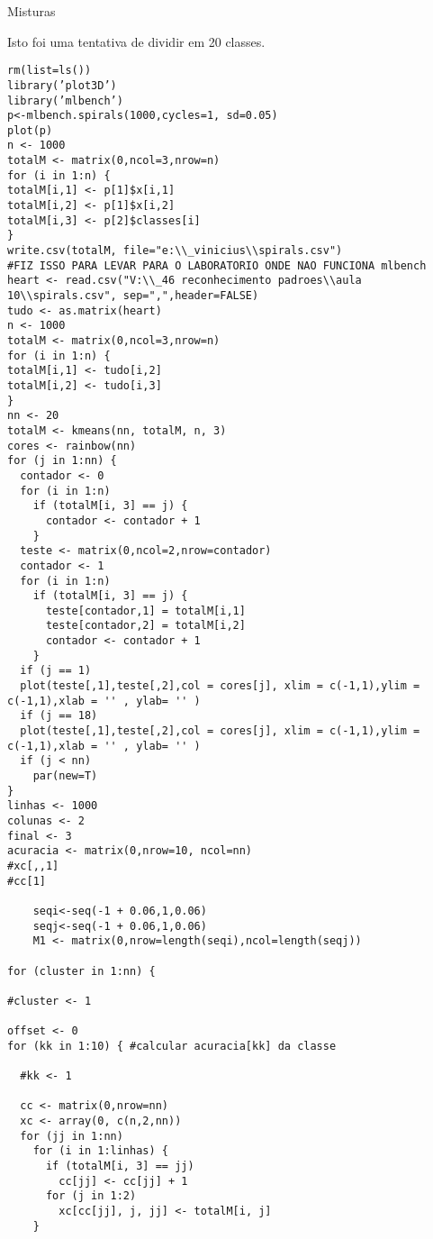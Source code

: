 \documentclass[12pt]{article}
\begin{document}
\Large

\begin{center}
Misturas
\end{center}

\normalsize

Isto foi uma tentativa de dividir em 20 classes.

\begin{verbatim}
rm(list=ls())
library(’plot3D’)
library(’mlbench’)
p<-mlbench.spirals(1000,cycles=1, sd=0.05)
plot(p)
n <- 1000
totalM <- matrix(0,ncol=3,nrow=n)
for (i in 1:n) {
totalM[i,1] <- p[1]$x[i,1]
totalM[i,2] <- p[1]$x[i,2]
totalM[i,3] <- p[2]$classes[i]
}
write.csv(totalM, file="e:\\_vinicius\\spirals.csv")
#FIZ ISSO PARA LEVAR PARA O LABORATORIO ONDE NAO FUNCIONA mlbench
heart <- read.csv("V:\\_46 reconhecimento padroes\\aula 10\\spirals.csv", sep=",",header=FALSE)
tudo <- as.matrix(heart)
n <- 1000
totalM <- matrix(0,ncol=3,nrow=n)
for (i in 1:n) {
totalM[i,1] <- tudo[i,2]
totalM[i,2] <- tudo[i,3]
}
nn <- 20
totalM <- kmeans(nn, totalM, n, 3)
cores <- rainbow(nn)
for (j in 1:nn) {
  contador <- 0
  for (i in 1:n)
    if (totalM[i, 3] == j) {
      contador <- contador + 1
    }
  teste <- matrix(0,ncol=2,nrow=contador)
  contador <- 1
  for (i in 1:n)
    if (totalM[i, 3] == j) {
      teste[contador,1] = totalM[i,1]
      teste[contador,2] = totalM[i,2]
      contador <- contador + 1
    }
  if (j == 1)
  plot(teste[,1],teste[,2],col = cores[j], xlim = c(-1,1),ylim = c(-1,1),xlab = '' , ylab= '' )
  if (j == 18)
  plot(teste[,1],teste[,2],col = cores[j], xlim = c(-1,1),ylim = c(-1,1),xlab = '' , ylab= '' )
  if (j < nn)
    par(new=T)
}
linhas <- 1000
colunas <- 2
final <- 3
acuracia <- matrix(0,nrow=10, ncol=nn)
#xc[,,1]
#cc[1]

    seqi<-seq(-1 + 0.06,1,0.06)
    seqj<-seq(-1 + 0.06,1,0.06)
    M1 <- matrix(0,nrow=length(seqi),ncol=length(seqj))

for (cluster in 1:nn) {

#cluster <- 1

offset <- 0
for (kk in 1:10) { #calcular acuracia[kk] da classe

  #kk <- 1

  cc <- matrix(0,nrow=nn)
  xc <- array(0, c(n,2,nn))
  for (jj in 1:nn)
    for (i in 1:linhas) {
      if (totalM[i, 3] == jj)
        cc[jj] <- cc[jj] + 1
      for (j in 1:2)
        xc[cc[jj], j, jj] <- totalM[i, j]
    }


\end{verbatim}
\end{document}
